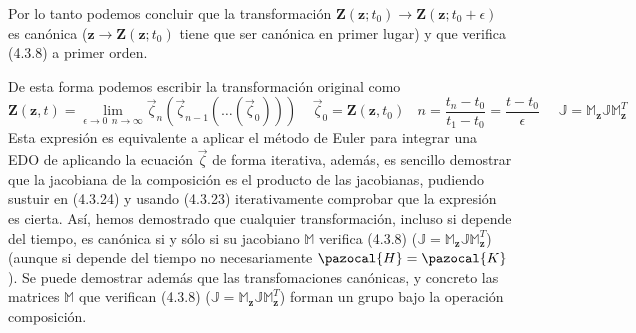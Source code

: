 Por lo tanto podemos concluir que la transformación $\mathbf{Z}(\mathbf{z};t_0) \rightarrow \mathbf{Z}(\mathbf{z};t_0 + \epsilon)$ es canónica ($\mathbf{z} \rightarrow \mathbf{Z}(\mathbf{z};t_0)$ tiene que ser canónica en primer lugar) y que verifica (4.3.8) a primer orden.

De esta forma podemos escribir la transformación original como 
\begin{equation} \label{4.2.7}
    \mathbf{Z}(\mathbf{z},t) = \lim_{\epsilon \rightarrow 0 \ \ n \rightarrow \infty} \vec{\zeta}_n(\vec{\zeta}_{n-1}(\dots(\vec{\zeta}_0))) \ \ \ \ \ \vec{\zeta}_0 = \mathbf{Z}(\mathbf{z},t_0) \ \ \ \  n = \frac{t_n-t_0}{t_1-t_0} = \frac{t-t_0}{\epsilon} \ \ \ \ \ \ \mathbb{J} = \mathbb{M}_\mathbf{z}\mathbb{J}\mathbb{M}_\mathbf{z}^T
\end{equation} 
Esta expresión es equivalente a aplicar el método de Euler para integrar una EDO de aplicando la ecuación $\vec{\zeta}$ de forma iterativa, además, es sencillo demostrar que la jacobiana de la composición es el producto de las jacobianas, pudiendo sustuir en (4.3.24) y usando (4.3.23) iterativamente comprobar que la expresión es cierta. Así, hemos demostrado que cualquier transformación, incluso si depende del tiempo, es canónica si y sólo si su jacobiano $\mathbb{M}$ verifica (4.3.8) ($\mathbb{J} = \mathbb{M}_\mathbf{z}\mathbb{J}\mathbb{M}_\mathbf{z}^T$) (aunque si depende del tiempo no necesariamente $\pazocal{H}=\pazocal{K}$).
Se puede demostrar además que las transfomaciones canónicas, y concreto las matrices $\mathbb{M}$ que verifican (4.3.8) ($\mathbb{J} = \mathbb{M}_\mathbf{z}\mathbb{J}\mathbb{M}_\mathbf{z}^T$) forman un grupo bajo la operación composición.


